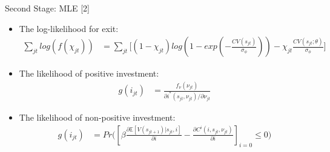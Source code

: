 \documentclass[xcolor=dvipsnames,envcountsect]{beamer}
\begin{document}
\begin{frame}{Second Stage: MLE [2]}
\begin{itemize}
    \item The log-likelihood for exit:
    \begin{align}
        \sum_{jt} log(f(\chi_{jt})) &= \sum_{jt} \Big[ (1-\chi_{jt}) log(1-exp(-\frac{CV(s_{jt})}{\sigma_\phi})) - \chi_{jt} \frac{CV(s_{jt};\theta)}{\sigma_\phi} \Big]
    \end{align}
    \item The likelihood of positive investment: 
    \begin{align}
        g(i_{jt}) &= \frac{f_\nu(\nu_{jt})}{\partial i^*(s_{jt},\nu_{jt}) /\partial \nu_{jt}}
    \end{align}
    \item The likelihood of non-positive investment: 
    \begin{align}
        g(i_{jt}) &= Pr\Big( [\beta\frac{\partial \mathbb{E}[V(s_{jt+1})|s_{jt},i]}{\partial i} - \frac{\partial C^i(i,s_{jt},\nu_{jt})}{\partial i}]_{i=0} \leq 0  \Big)
    \end{align}
\end{itemize}
\end{frame}
\end{document}
